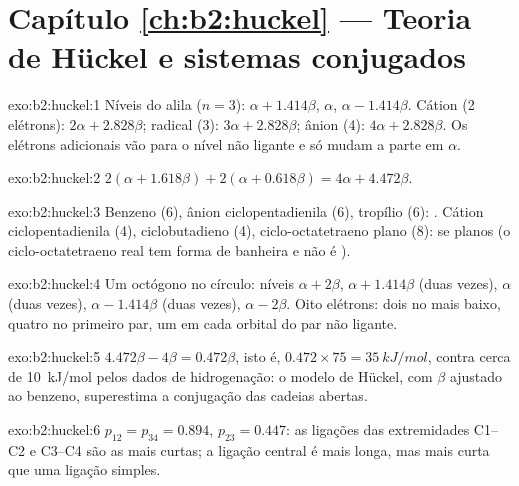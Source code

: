 \section*{Capítulo \ref{ch:b2:huckel} --- Teoria de Hückel e sistemas conjugados}

\begin{solution}{exo:b2:huckel:1}
Níveis do alila ($n = 3$): $\alpha + 1.414\beta$, $\alpha$, $\alpha - 1.414\beta$. Cátion (2 elétrons):
$2\alpha + 2.828\beta$; radical (3): $3\alpha + 2.828\beta$; ânion (4): $4\alpha + 2.828\beta$. Os
elétrons adicionais vão para o nível não ligante e só mudam a parte em $\alpha$.
\end{solution}

\begin{solution}{exo:b2:huckel:2}
$2(\alpha + 1.618\beta) + 2(\alpha + 0.618\beta) = 4\alpha + 4.472\beta$.
\end{solution}

\begin{solution}{exo:b2:huckel:3}
Benzeno (6), ânion ciclopentadienila (6), tropílio (6): . Cátion
ciclopentadienila (4), ciclobutadieno (4), ciclo-octatetraeno plano (8):
 se planos (o ciclo-octatetraeno real tem forma de banheira e
não é ).
\end{solution}

\begin{solution}{exo:b2:huckel:4}
Um octógono no círculo: níveis $\alpha + 2\beta$, $\alpha + 1.414\beta$ (duas vezes), $\alpha$ (duas vezes),
$\alpha - 1.414\beta$ (duas vezes), $\alpha - 2\beta$. Oito elétrons: dois no mais baixo,
quatro no primeiro par, um em cada orbital do par não ligante.
\end{solution}

\begin{solution}{exo:b2:huckel:5}
$4.472\beta - 4\beta = 0.472\beta$, isto é, $0.472 \times 75 = \qty{35}{kJ/mol}$, contra cerca de
\qty{10}{kJ/mol} pelos dados de hidrogenação: o modelo de Hückel, com $\beta$ ajustado
ao benzeno, superestima a conjugação das cadeias abertas.
\end{solution}

\begin{solution}{exo:b2:huckel:6}
$p_{12} = p_{34} = 0.894$, $p_{23} = 0.447$: as ligações das extremidades C1--C2 e
C3--C4 são as mais curtas; a ligação central é mais longa, mas mais curta que
uma ligação simples.
\end{solution}

